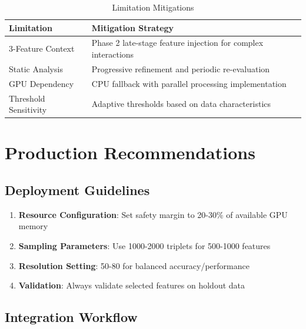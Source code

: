 \documentclass[11pt,a4paper]{article}
\begin{document}
\begin{table}[h!]
\centering
\caption{Limitation Mitigations}
\label{tab:mitigations}
\begin{tabular}{lp{8cm}}
\toprule
\textbf{Limitation} & \textbf{Mitigation Strategy} \\
\midrule
3-Feature Context & Phase 2 late-stage feature injection for complex interactions \\
Static Analysis & Progressive refinement and periodic re-evaluation \\
GPU Dependency & CPU fallback with parallel processing implementation \\
Threshold Sensitivity & Adaptive thresholds based on data characteristics \\
\bottomrule
\end{tabular}
\end{table}

\section{Production Recommendations}

\subsection{Deployment Guidelines}

\begin{enumerate}
\item \textbf{Resource Configuration}: Set safety margin to 20-30\% of available GPU memory
\item \textbf{Sampling Parameters}: Use 1000-2000 triplets for 500-1000 features
\item \textbf{Resolution Setting}: 50-80 for balanced accuracy/performance
\item \textbf{Validation}: Always validate selected features on holdout data
\end{enumerate}

\subsection{Integration Workflow}
\end{document}
